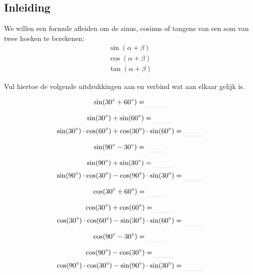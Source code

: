 \documentclass[a4paper,12pt]{article}
\begin{document}
\begin{theorie}

\subsection{Inleiding}
We willen een formule afleiden om de sinus, cosinus of tangens van een som van twee hoeken te berekenen:
\begin{align*}
  \sin(\alpha + \beta)\\
  \cos(\alpha + \beta)\\
  \tan(\alpha+\beta)
\end{align*}

Vul hiertoe de volgende uitdrukkingen aan en verbind wat aan elkaar gelijk is.

\begin{minipage}{0.4\textwidth}
  $$\sin(30\degree + 60\degree)=\arule{1cm}$$
\end{minipage}
\begin{minipage}{0.5\textwidth}
  $$\sin(30\degree) + \sin(60\degree)=\arule{1cm}$$
  $$\sin(30\degree)\cdot\cos(60\degree)+\cos(30\degree)\cdot\sin(60\degree)=\arule{1cm}$$
\end{minipage}

\begin{minipage}{0.4\textwidth}
  $$\sin(90\degree - 30\degree)=\arule{1cm}$$
\end{minipage}
\begin{minipage}{0.5\textwidth}
  $$\sin(90\degree) + \sin(30\degree)=\arule{1cm}$$
  $$\sin(90\degree)\cdot\cos(30\degree)-\cos(90\degree)\cdot\sin(30\degree)=\arule{1cm}$$
\end{minipage}

\begin{minipage}{0.4\textwidth}
  $$\cos(30\degree + 60\degree)=\arule{1cm}$$
\end{minipage}
\begin{minipage}{0.5\textwidth}
  $$\cos(30\degree) + \cos(60\degree)=\arule{1cm}$$
  $$\cos(30\degree)\cdot\cos(60\degree)-\sin(30\degree)\cdot\sin(60\degree)=\arule{1cm}$$
\end{minipage}

\begin{minipage}{0.4\textwidth}
  $$\cos(90\degree - 30\degree)=\arule{1cm}$$
\end{minipage}
\begin{minipage}{0.5\textwidth}
  $$\cos(90\degree) - \cos(30\degree)=\arule{1cm}$$
  $$\cos(90\degree)\cdot\cos(30\degree)-\sin(90\degree)\cdot\sin(30\degree)=\arule{1cm}$$
\end{minipage}




\end{theorie}
\end{document}
